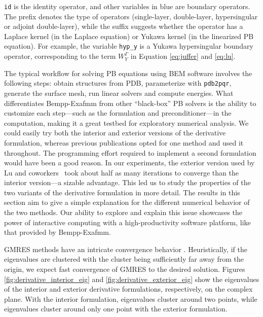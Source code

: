 \noindent
\texttt{id} is the identity operator, and other variables in blue are boundary operators.
The prefix denotes the type of operators (single-layer, double-layer, hypersingular or adjoint double-layer), while the suffix suggests whether the operator has a Laplace kernel (in the Laplace equation) or Yukawa kernel (in the linearized PB equation).
For example, the variable \texttt{hyp\_y} is a Yukawa hypersingular boundary operator, corresponding to the term $W_{Y}^{\Gamma}$ in Equation \ref{eq:juffer} and \ref{eq:lu}.

The typical workflow for solving PB equations using BEM software involves the following steps: obtain structures from PDB, parameterize with \texttt{pdb2pqr}, generate the surface mesh, run linear solvers and compute energies.
What differentiates Bempp-Exafmm from other ``black-box'' PB solvers is the ability to customize each step---such as the formulation and preconditioner---in the computation, making it a great testbed for exploratory numerical analysis.
We could easily try both the interior and exterior versions of the derivative formulation, whereas previous publications opted for one method and used it throughout.
The programming effort required to implement a second formulation would have been a good reason.
In our experiments, the exterior version used by Lu and coworkers~\cite{LuETal2006,LuETal2009,ZhangETal2019} took about half as many iterations to converge than the interior version---a sizable advantage.
This led us to study the properties of the two variants of the derivative formulation in more detail.
The results in this section aim to give a simple explanation for the different numerical behavior of the two methods.
Our ability to explore and explain this issue showcases the power of interactive computing with a high-productivity software platform, like that provided by Bempp-Exafmm.

GMRES methods have an intricate convergence behavior \cite{mark1999a}.
Heuristically, if the eigenvalues are clustered with the cluster being sufficiently far away from the origin, we expect fast convergence of GMRES to the desired solution.
Figures \ref{fig:derivative_interior_eig} and \ref{fig:derivative_exterior_eig} show the eigenvalues of the interior and exterior derivative formulations, respectively, on the complex plane.
With the interior formulation, eigenvalues cluster around two points, while eigenvalues cluster around only one point with the exterior formulation.

